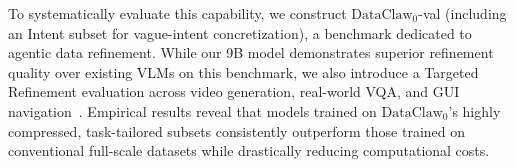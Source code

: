 \documentclass{llmxive}
\begin{document}
To systematically evaluate this capability, we construct $\text{DataClaw}_0$-val (including an Intent subset for vague-intent concretization), a benchmark dedicated to agentic data refinement. 
While our 9B model demonstrates superior refinement quality over existing VLMs on this benchmark, we also introduce a Targeted Refinement evaluation across video generation, real-world VQA, and GUI navigation~\cite{grauman2022ego4d,remot,deng2009imagenet}. Empirical results reveal that models trained on $\text{DataClaw}_0$'s highly compressed, task-tailored subsets consistently outperform those trained on conventional full-scale datasets while drastically reducing computational costs. 


\end{document}
